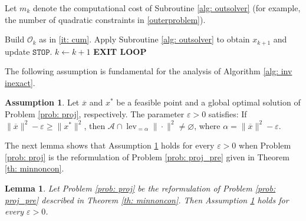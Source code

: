 \documentclass[12pt]{amsart}
\theoremstyle{plain}
\newtheorem{lemma}[theorem]{Lemma}
\theoremstyle{definition}
\newtheorem{assumption}[theorem]{Assumption}
\begin{document}
Let \(m_k\) denote the computational cost of Subroutine \ref{alg: outsolver} (for example, the number of quadratic constraints in \eqref{outerproblem}).

\makeatletter
\renewcommand*{\ALG@name}{Algorithm}
\makeatother
\setcounter{algorithm}{0}

\begin{algorithm}[H]
\caption{Inverse inexact cutting sphere}
\label{alg: inv inexact}
\begin{algorithmic}[1]
\LOOP
        \STATE Build \(\mathcal{O}_k\) as in \eqref{it: cum}.
        \STATE Apply Subroutine \ref{alg: outsolver} to obtain \(x_{k+1}\) and update \(\texttt{STOP}\).
        \STATE \(k \leftarrow k + 1\)
    \ELSE
        \STATE \textbf{EXIT LOOP}
    \ENDIF
\ENDLOOP
\end{algorithmic}
\end{algorithm}

The following assumption is fundamental for the analysis of Algorithm \ref{alg: inv inexact}.

\begin{assumption}
\label{assumption:epsilon}
Let \(\overline{x}\) and \(x^*\) be a feasible point and a global optimal solution of Problem \eqref{prob: proj}, respectively. The parameter \(\varepsilon > 0\) satisfies:
If \(\|\overline{x}\|^2 - \varepsilon \ge \|x^*\|^2\), then \(\mathcal{A} \cap \operatorname{lev}_{=\alpha} \|\cdot\|^2 \neq \varnothing\), where \(\alpha = \|\overline{x}\|^2 - \varepsilon\).
\end{assumption}

The next lemma shows that Assumption \ref{assumption:epsilon} holds for every \(\varepsilon > 0\) when Problem \eqref{prob: proj} is the reformulation of Problem \eqref{prob: proj_pre} given in Theorem \ref{th: minnoncon}.

\begin{lemma}
\label{lem: ass epsilon holds}
Let Problem \eqref{prob: proj} be the reformulation of Problem \eqref{prob: proj_pre} described in Theorem \ref{th: minnoncon}. Then Assumption \ref{assumption:epsilon} holds for every \(\varepsilon > 0\).
\end{lemma}
\end{document}
